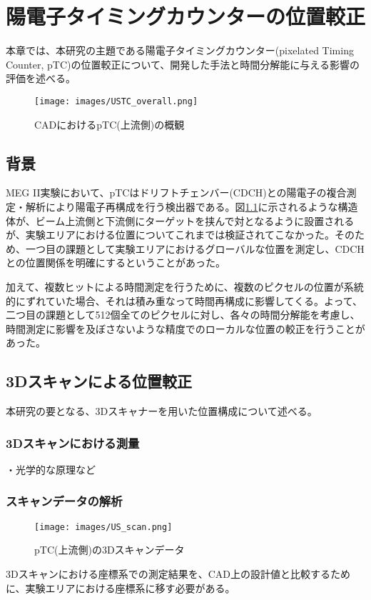 \documentclass[Yonemoto_master.tex]{subfiles}
\begin{document}
\chapter{陽電子タイミングカウンターの位置較正}
本章では、本研究の主題である陽電子タイミングカウンター(pixelated Timing Counter, pTC)の位置較正について、開発した手法と時間分解能に与える影響の評価を述べる。

\begin{figure}[h]
\begin{center}
\texttt{[image: images/USTC\_overall.png]}
\caption{CADにおけるpTC(上流側)の概観}
\label{fig: pTC_CAD}
\end{center}
\end{figure}

\section{背景}
MEG II実験において、pTCはドリフトチェンバー(CDCH)との陽電子の複合測定・解析により陽電子再構成を行う検出器である。図\ref{fig: pTC_CAD}に示されるような構造体が、ビーム上流側と下流側にターゲットを挟んで対となるように設置されるが、実験エリアにおける位置についてこれまでは検証されてこなかった。そのため、一つ目の課題として実験エリアにおけるグローバルな位置を測定し、CDCHとの位置関係を明確にするということがあった。

加えて、複数ヒットによる時間測定を行うために、複数のピクセルの位置が系統的にずれていた場合、それは積み重なって時間再構成に影響してくる。よって、二つ目の課題として512個全てのピクセルに対し、各々の時間分解能を考慮し、時間測定に影響を及ぼさないような精度でのローカルな位置の較正を行うことがあった。

\section{3Dスキャンによる位置較正}
本研究の要となる、3Dスキャナーを用いた位置構成について述べる。

\subsection{3Dスキャンにおける測量}
・光学的な原理など
\subsection{スキャンデータの解析}
\begin{figure}[h]
\begin{center}
\texttt{[image: images/US\_scan.png]}
\caption{pTC(上流側)の3Dスキャンデータ}
\end{center}
\end{figure}
3Dスキャンにおける座標系での測定結果を、CAD上の設計値と比較するために、実験エリアにおける座標系に移す必要がある。
\end{document}
